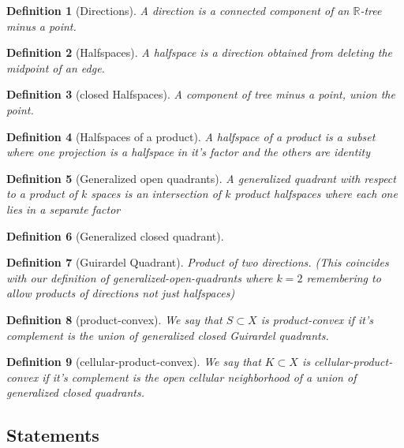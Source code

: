 \documentclass{article}
\theoremstyle{mystyle}
\newtheorem{defn}{Definition}
\theoremstyle{remark}
\begin{document}
\begin{defn}[Directions] A {\em direction} is a connected component of an \(\mathbb{R}\)-tree minus a point. 
\end{defn}
\begin{defn}[Halfspaces] A halfspace is a direction obtained from deleting the midpoint of an edge.
\end{defn}
\begin{defn}[closed Halfspaces] A component of tree minus a point, union the point.
\end{defn}
\begin{defn}[Halfspaces of a product] A halfspace of a product is a subset where one projection is a halfspace in it's factor and the others are identity
\end{defn}
\begin{defn}[Generalized open quadrants] A generalized quadrant with respect to a product of \(k\) spaces is an intersection of \(k\) product halfspaces where each one lies in a separate factor 
\end{defn}
\begin{defn}
    [Generalized closed quadrant]
\end{defn}
\begin{defn}
    [Guirardel Quadrant]
    Product of two directions. (This coincides with our definition of generalized-open-quadrants where \(k=2\) remembering to allow products of directions not just halfspaces)
\end{defn}
\begin{defn}[product-convex] We say that \(S\subset X\) is product-convex if it's complement is the union of generalized closed Guirardel quadrants.
\end{defn}
\begin{defn}[cellular-product-convex] We say that \(K \subset X\) is cellular-product-convex if it's complement is the open cellular neighborhood of a union of generalized closed quadrants.
\end{defn}

\subsection{Statements}
\end{document}
